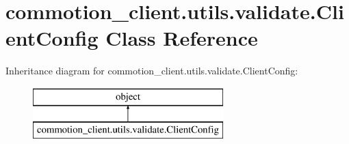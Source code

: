 \hypertarget{classcommotion__client_1_1utils_1_1validate_1_1ClientConfig}{\section{commotion\+\_\+client.\+utils.\+validate.\+Client\+Config Class Reference}
\label{classcommotion__client_1_1utils_1_1validate_1_1ClientConfig}
}
Inheritance diagram for commotion\+\_\+client.\+utils.\+validate.\+Client\+Config\+:\begin{figure}[H]
\begin{center}
\leavevmode
\includegraphics[height=2.000000cm]{classcommotion__client_1_1utils_1_1validate_1_1ClientConfig}
\end{center}
\end{figure}
